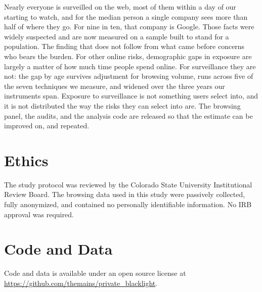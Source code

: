 \documentclass[12pt, letterpaper]{article}
\begin{document}
Nearly everyone is surveilled on the web, most of them within a day of our starting to watch, and for the median person a single company sees more than half of where they go. For nine in ten, that company is Google. Those facts were widely suspected and are now measured on a sample built to stand for a population. The finding that does not follow from what came before concerns who bears the burden. For other online risks, demographic gaps in exposure are largely a matter of how much time people spend online. For surveillance they are not: the gap by age survives adjustment for browsing volume, runs across five of the seven techniques we measure, and widened over the three years our instruments span.
Exposure to surveillance is not something users select into, and it is not distributed the way the risks they can select into are. The browsing panel, the audits, and the analysis code are released so that the estimate can be improved on, and repeated.

\section*{Ethics}
The study protocol was reviewed by the Colorado State University Institutional Review Board. The browsing data used in this study were passively collected, fully anonymized, and contained no personally identifiable information. No IRB approval was required.

\section*{Code and Data}
Code and data is available under an open source license at \url{https://github.com/themains/private_blacklight}.

\FloatBarrier
\singlespacing
\clearpage
% 


\clearpage

\appendix
\onehalfspacing
\renewcommand{\thesection}{\Alph{section}}
\renewcommand\thetable{\thesection.\arabic{table}}
\renewcommand\thefigure{\thesection.\arabic{figure}}
\renewcommand\theequation{\thesection.\arabic{equation}}
\end{document}
